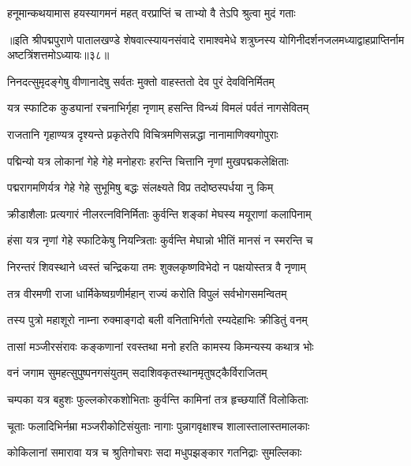 \twolineshloka
{हनूमान्कथयामास हयस्यागमनं महत्}
{वरप्राप्तिं च ताभ्यो वै तेऽपि श्रुत्वा मुदं गताः}%

॥इति श्रीपद्मपुराणे पातालखण्डे शेषवात्स्यायनसंवादे रामाश्वमेधे शत्रुघ्नस्य योगिनीदर्शनजलमध्याद्वाहप्राप्तिर्नाम अष्टत्रिंशत्तमोऽध्यायः॥३८॥



\twolineshloka
{निनदत्सुमृदङ्गेषु वीणानादेषु सर्वतः}
{मुक्तो वाहस्ततो देव पुरं देवविनिर्मितम्}%

\twolineshloka
{यत्र स्फाटिक कुड्यानां रचनाभिर्गृहा नृणाम्}
{हसन्ति विन्ध्यं विमलं पर्वतं नागसेवितम्}%

\twolineshloka
{राजतानि गृहाण्यत्र दृश्यन्ते प्रकृतेरपि}
{विचित्रमणिसन्नद्धा नानामाणिक्यगोपुराः}%

\twolineshloka
{पद्मिन्यो यत्र लोकानां गेहे गेहे मनोहराः}
{हरन्ति चित्तानि नृणां मुखपद्मकलेक्षिताः}%

\twolineshloka
{पद्मरागमणिर्यत्र गेहे गेहे सुभूमिषु}
{बद्धः संलक्ष्यते विप्र तदोष्ठस्पर्धया नु किम्}%

\twolineshloka
{क्रीडाशैलाः प्रत्यगारं नीलरत्नविनिर्मिताः}
{कुर्वन्ति शङ्कां मेघस्य मयूराणां कलापिनाम्}%

\twolineshloka
{हंसा यत्र नृणां गेहे स्फाटिकेषु नियन्त्रिताः}
{कुर्वन्ति मेघान्नो भीतिं मानसं न स्मरन्ति च}%

\twolineshloka
{निरन्तरं शिवस्थाने ध्वस्तं चन्द्रिकया तमः}
{शुक्लकृष्णविभेदो न पक्षयोस्तत्र वै नृणाम्}%

\twolineshloka
{तत्र वीरमणी राजा धार्मिकेष्वग्रणीर्महान्}
{राज्यं करोति विपुलं सर्वभोगसमन्वितम्}%

\twolineshloka
{तस्य पुत्रो महाशूरो नाम्ना रुक्माङ्गदो बली}
{वनिताभिर्गतो रम्यदेहाभिः क्रीडितुं वनम्}%

\twolineshloka
{तासां मञ्जीरसंरावः कङ्कणानां रवस्तथा}
{मनो हरति कामस्य किमन्यस्य कथात्र भोः}%

\twolineshloka
{वनं जगाम सुमहत्सुपुष्पनगसंयुतम्}
{सदाशिवकृतस्थानमृतुषट्कैर्विराजितम्}%

\twolineshloka
{चम्पका यत्र बहुशः फुल्लकोरकशोभिताः}
{कुर्वन्ति कामिनां तत्र हृच्छयार्तिं विलोकिताः}%

\twolineshloka
{चूताः फलादिभिर्नम्रा मञ्जरीकोटिसंयुताः}
{नागाः पुन्नागवृक्षाश्च शालास्तालास्तमालकाः}%

\twolineshloka
{कोकिलानां समारावा यत्र च श्रुतिगोचराः}
{सदा मधुपझङ्कार गतनिद्राः सुमल्लिकाः}%


